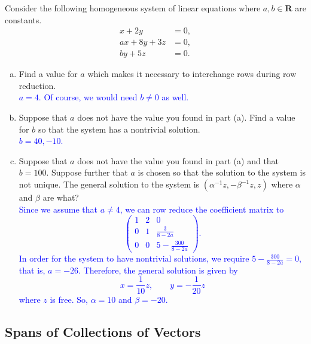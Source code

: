 \documentclass[a4paper,11pt]{article}
\newcommand{\R}{\mathbf{R}}
\newcommand{\BB}[1]{\textcolor{blue}{#1}}
\begin{document}
 Consider the following homogeneous system of
linear equations where $a,b \in \R$ are constants.
\begin{align*}
  x+2y &= 0, \\
  ax+8y+3z &= 0, \\
  by+5z &= 0.
\end{align*}
\begin{enumerate}[(a)]
\item Find a value for $a$ which makes it necessary to interchange rows during
  row reduction. \\

  \BB{$a=4$. Of course, we would need $b \neq 0$ as well. \\}
  
\item Suppose that $a$ does not have the value you found in part (a). Find a
  value for $b$ so that the system has a nontrivial solution. \\

  \BB{$b=40,-10$. \\}
  
\item Suppose that $a$ does not have the value you found in part (a) and that
  $b=100$. Suppose further that $a$ is chosen so that the solution to the system
  is not unique. The general solution to the system is
  $(\alpha^{-1}z,-\beta^{-1}z,z)$ where $\alpha$ and $\beta$ are what? \\

  \BB{Since we assume that $a \neq 4$, we can row reduce the coefficient matrix
    to
    \[
      \left(
        \begin{array}{rrr}
          1 & 2 & 0 \\
          0 & 1 & \frac{3}{8-2a} \\
          0 & 0 & 5-\frac{300}{8-2a}
        \end{array}
      \right).
    \]
    In order for the system to have nontrivial solutions, we require
    $5-\frac{300}{8-2a}=0$, that is, $a=-26$. Therefore, the general solution is
    given by
    \[
      x=\frac{1}{10}z, \qquad y=-\frac{1}{20}z
    \]
    where $z$ is free. So, $\alpha=10$ and $\beta=-20$. \\
  }
\end{enumerate}

\subsection*{Spans of Collections of Vectors}
\end{document}
